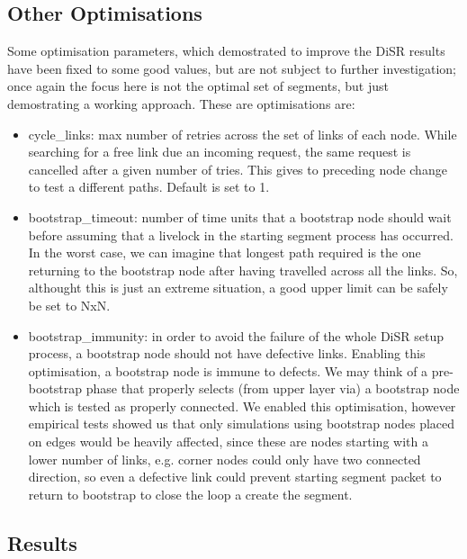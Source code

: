 \subsection{Other Optimisations}
Some optimisation parameters, which demostrated to improve the DiSR
results have been fixed to some good values, but are not subject to
further investigation; once again the focus here is not the
optimal set of segments, but just demostrating a working approach. 
These are optimisations are:
\begin{itemize}
\item{cycle\_links}: max number of retries across the set of links of
each node. While searching for a free link due an incoming request,
the same request is cancelled after a given number of tries. This
gives to preceding node change to test a different paths. Default is set to 1.
\item{bootstrap\_timeout}: number of time units that a bootstrap node
should wait before assuming that a livelock in the starting segment
process has occurred. In the worst case, we can imagine that longest
path required is the one returning to the bootstrap node after having
travelled across all the links. So, althought this is just an extreme
situation, a good upper limit can be safely be set to NxN.
\item{bootstrap\_immunity}: in order to avoid the failure of the whole DiSR
setup process, a bootstrap node should not have defective links.
Enabling this optimisation, a bootstrap node is immune to defects.
We may think of a pre-bootstrap phase that properly selects (from upper
layer via) a bootstrap node which is tested as properly connected. We
enabled this optimisation, however empirical tests showed us that only
simulations using bootstrap nodes placed on edges would be heavily
affected, since these are nodes starting with a lower number of links,
e.g. corner nodes could only have two connected direction, so even a
defective link could prevent starting segment packet to return to
bootstrap to close the loop a create the segment.
\end{itemize}

\subsection{Results}
\label{sec:results}

